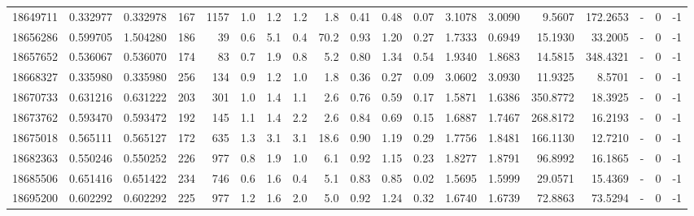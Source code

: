 \begin{tabular}{rrrrrrrrrrrrrrrrlrr}
  18649711 & 0.332977 &   0.332978 &  167 & 1157 &      1.0 &      1.2 &     1.2 &      1.8 &       0.41 &        0.48 &        0.07 &  3.1078 &  3.0090 &    9.5607 &  172.2653 &             - &        0 &         -1 \\
  18656286 & 0.599705 &   1.504280 &  186 &   39 &      0.6 &      5.1 &     0.4 &     70.2 &       0.93 &        1.20 &        0.27 &  1.7333 &  0.6949 &   15.1930 &   33.2005 &             - &        0 &         -1 \\
  18657652 & 0.536067 &   0.536070 &  174 &   83 &      0.7 &      1.9 &     0.8 &      5.2 &       0.80 &        1.34 &        0.54 &  1.9340 &  1.8683 &   14.5815 &  348.4321 &             - &        0 &         -1 \\
  18668327 & 0.335980 &   0.335980 &  256 &  134 &      0.9 &      1.2 &     1.0 &      1.8 &       0.36 &        0.27 &        0.09 &  3.0602 &  3.0930 &   11.9325 &    8.5701 &             - &        0 &         -1 \\
  18670733 & 0.631216 &   0.631222 &  203 &  301 &      1.0 &      1.4 &     1.1 &      2.6 &       0.76 &        0.59 &        0.17 &  1.5871 &  1.6386 &  350.8772 &   18.3925 &             - &        0 &         -1 \\
  18673762 & 0.593470 &   0.593472 &  192 &  145 &      1.1 &      1.4 &     2.2 &      2.6 &       0.84 &        0.69 &        0.15 &  1.6887 &  1.7467 &  268.8172 &   16.2193 &             - &        0 &         -1 \\
  18675018 & 0.565111 &   0.565127 &  172 &  635 &      1.3 &      3.1 &     3.1 &     18.6 &       0.90 &        1.19 &        0.29 &  1.7756 &  1.8481 &  166.1130 &   12.7210 &             - &        0 &         -1 \\
  18682363 & 0.550246 &   0.550252 &  226 &  977 &      0.8 &      1.9 &     1.0 &      6.1 &       0.92 &        1.15 &        0.23 &  1.8277 &  1.8791 &   96.8992 &   16.1865 &             - &        0 &         -1 \\
  18685506 & 0.651416 &   0.651422 &  234 &  746 &      0.6 &      1.6 &     0.4 &      5.1 &       0.83 &        0.85 &        0.02 &  1.5695 &  1.5999 &   29.0571 &   15.4369 &             - &        0 &         -1 \\
  18695200 & 0.602292 &   0.602292 &  225 &  977 &      1.2 &      1.6 &     2.0 &      5.0 &       0.92 &        1.24 &        0.32 &  1.6740 &  1.6739 &   72.8863 &   73.5294 &             - &        0 &         -1 \\

\end{tabular}
